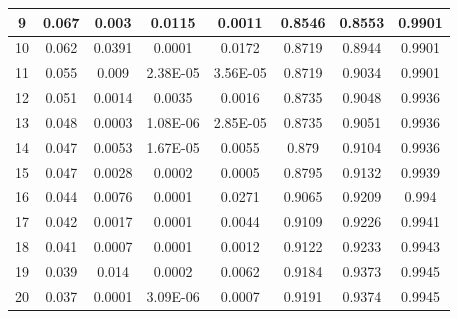 \begin{table}[h!]
{\begin{tabular}{|c|c|c|c|c|c|c|c|}
    \hline
    9     & 0.067 & 0.003 & 0.0115 & 0.0011 & 0.8546 & 0.8553 & 0.9901 \\
    \hline
    10    & 0.062 & 0.0391 & 0.0001 & 0.0172 & 0.8719 & 0.8944 & 0.9901 \\
    \hline
    11    & 0.055 & 0.009 & 2.38E-05 & 3.56E-05 & 0.8719 & 0.9034 & 0.9901 \\
    \hline
    12    & 0.051 & 0.0014 & 0.0035 & 0.0016 & 0.8735 & 0.9048 & 0.9936 \\
    \hline
    13    & 0.048 & 0.0003 & 1.08E-06 & 2.85E-05 & 0.8735 & 0.9051 & 0.9936 \\
    \hline
    14    & 0.047 & 0.0053 & 1.67E-05 & 0.0055 & 0.879 & 0.9104 & 0.9936 \\
    \hline
    15    & 0.047 & 0.0028 & 0.0002 & 0.0005 & 0.8795 & 0.9132 & 0.9939 \\
    \hline
    16    & 0.044 & 0.0076 & 0.0001 & 0.0271 & 0.9065 & 0.9209 & 0.994 \\
    \hline
    17    & 0.042 & 0.0017 & 0.0001 & 0.0044 & 0.9109 & 0.9226 & 0.9941 \\
    \hline
    18    & 0.041 & 0.0007 & 0.0001 & 0.0012 & 0.9122 & 0.9233 & 0.9943 \\
    \hline
    19    & 0.039 & 0.014 & 0.0002 & 0.0062 & 0.9184 & 0.9373 & 0.9945 \\
    \hline
    20    & 0.037 & 0.0001 & 3.09E-06 & 0.0007 & 0.9191 & 0.9374 & 0.9945 \\
    \hline
    \end{tabular}%
    }
  \label{tab:addlabel}%
\end{table}%
